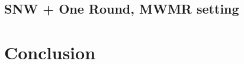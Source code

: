 \documentclass[conference]{IEEEtran}
\begin{document}
\subsection{SNW + One Round,  MWMR setting}\label{mwmr_snow_one_round}

%
\vspace{-0.8em}


%
%
\vspace{-0.8em}
\section{Conclusion}





\appendix
%

%

%

%



%

%

%
\end{document}
